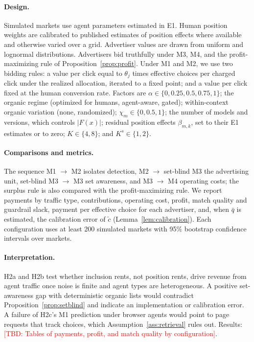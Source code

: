 \documentclass[opre,dblanonrev]{informs4}
\providecommand{\1}{\mathbf{1}}
\providecommand{\TBD}[1]{\textcolor{red}{[TBD: #1]}}
\begin{document}
\paragraph{Design.} Simulated markets use agent parameters estimated in E1. Human position weights are calibrated to published estimates of position effects \citep{ursu2018power} where available and otherwise varied over a grid. Advertiser values are drawn from uniform and lognormal distributions. Advertisers bid truthfully under M3, M4, and the profit-maximizing rule of Proposition~\ref{prop:profit}. Under M1 and M2, we use two bidding rules: a value per click equal to $\theta_j$ times effective choices per charged click under the realized allocation, iterated to a fixed point; and a value per click fixed at the human conversion rate. Factors are $\alpha\in\{0,0.25,0.5,0.75,1\}$; the organic regime (optimized for humans, agent-aware, gated); within-context organic variation (none, randomized); $\chi_m\in\{0,0.5,1\}$; the number of models and versions, which controls $|F(x)|$; residual position effects $\beta_{m,k}$, set to their E1 estimates or to zero; $K\in\{4,8\}$; and $K^s\in\{1,2\}$.

\paragraph{Comparisons and metrics.} The sequence M1 $\to$ M2 isolates detection, M2 $\to$ set-blind M3 the advertising unit, set-blind M3 $\to$ M3 set awareness, and M3 $\to$ M4 operating costs; the surplus rule is also compared with the profit-maximizing rule. We report payments by traffic type, contributions, operating cost, profit, match quality and guardrail slack, payment per effective choice for each advertiser, and, when $\bar q$ is estimated, the calibration error of $\tilde c$ (Lemma~\ref{lem:calibration}). Each configuration uses at least 200 simulated markets with 95\% bootstrap confidence intervals over markets.

\paragraph{Interpretation.} H2a and H2b test whether inclusion rents, not position rents, drive revenue from agent traffic once noise is finite and agent types are heterogeneous. A positive set-awareness gap with deterministic organic lists would contradict Proposition~\ref{prop:setblind} and indicate an implementation or calibration error. A failure of H2c's M1 prediction under browser agents would point to page requests that track choices, which Assumption~\ref{ass:retrieval} rules out. Results: \TBD{Tables of payments, profit, and match quality by configuration}.
\end{document}
